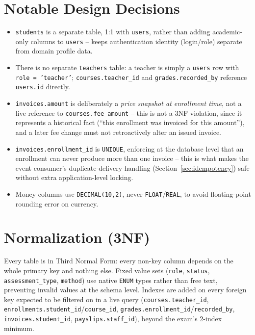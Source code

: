 \documentclass[11pt,a4paper]{report}
\begin{document}
\section{Notable Design Decisions}
\begin{itemize}[leftmargin=1.4em]
  \item \texttt{students} is a separate table, 1:1 with \texttt{users}, rather than adding academic-only columns to \texttt{users} -- keeps authentication identity (login/role) separate from domain profile data.
  \item There is no separate \texttt{teachers} table: a teacher is simply a \texttt{users} row with \texttt{role = 'teacher'}; \texttt{courses.teacher\_id} and \texttt{grades.recorded\_by} reference \texttt{users.id} directly.
  \item \texttt{invoices.amount} is deliberately a \emph{price snapshot at enrollment time}, not a live reference to \texttt{courses.fee\_amount} -- this is not a 3NF violation, since it represents a historical fact (``this enrollment was invoiced for this amount''), and a later fee change must not retroactively alter an issued invoice.
  \item \texttt{invoices.enrollment\_id} is \texttt{UNIQUE}, enforcing at the database level that an enrollment can never produce more than one invoice -- this is what makes the event consumer's duplicate-delivery handling (Section~\ref{sec:idempotency}) safe without extra application-level locking.
  \item Money columns use \texttt{DECIMAL(10,2)}, never \texttt{FLOAT}/\texttt{REAL}, to avoid floating-point rounding error on currency.
\end{itemize}

\section{Normalization (3NF)}
Every table is in Third Normal Form: every non-key column depends on the
whole primary key and nothing else. Fixed value sets (\texttt{role},
\texttt{status}, \texttt{assessment\_type}, \texttt{method}) use native
\texttt{ENUM} types rather than free text, preventing invalid values at the
schema level. Indexes are added on every foreign key expected to be
filtered on in a live query (\texttt{courses.teacher\_id},
\texttt{enrollments.student\_id}/\texttt{course\_id},
\texttt{grades.enrollment\_id}/\texttt{recorded\_by},
\texttt{invoices.student\_id}, \texttt{payslips.staff\_id}), beyond the
exam's 2-index minimum.
\end{document}
